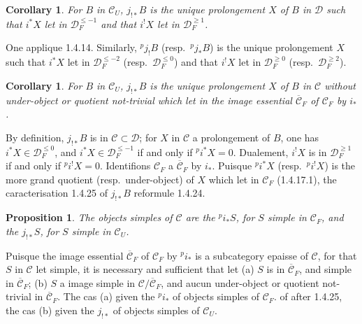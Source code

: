 \documentclass[12pt,a4paper]{article}
\theoremstyle{plain}
\newtheorem{proposition}[theorem]{Proposition}
\newtheorem{corollary}[theorem]{Corollary}
\theoremstyle{definition}
\begin{document}
\begin{corollary}\label{cor:1.4.24}
For $B$ in $\mathcal{C}_U$, $j_{!*} B$ is the unique prolongement $X$ of $B$ in $\mathcal{D}$ such that $i^* X$ let in $\mathcal{D}_F^{\leqslant -1}$ and that $i^! X$ let in $\mathcal{D}_F^{\geqslant 1}$.
\end{corollary}

One applique 1.4.14. Similarly, ${}^p j_! B$ (resp.\ ${}^p j_* B$) is the unique prolongement $X$ such that $i^* X$ let in $\mathcal{D}_F^{\leqslant -2}$ (resp.\ $\mathcal{D}_F^{\leqslant 0}$) and that $i^! X$ let in $\mathcal{D}_F^{\geqslant 0}$ (resp.\ $\mathcal{D}_F^{\geqslant 2}$).

\begin{corollary}\label{cor:1.4.25}
For $B$ in $\mathcal{C}_U$, $j_{!*} B$ is the unique prolongement $X$ of $B$ in $\mathcal{C}$ without under-object or quotient not-trivial which let in the image essential $\overline{\mathcal{C}}_F$ of $\mathcal{C}_F$ by $i_*$.
\end{corollary}

By definition, $j_{!*} B$ is in $\mathcal{C} \subset \mathcal{D}$; for $X$ in $\mathcal{C}$ a prolongement of $B$, one has $i^* X \in \mathcal{D}_F^{\leqslant 0}$, and $i^* X \in \mathcal{D}_F^{\leqslant -1}$ if and only if ${}^p i^* X = 0$. Dualement, $i^! X$ is in $\mathcal{D}_F^{\geqslant 1}$ if and only if ${}^p i^! X = 0$. Identifions $\mathcal{C}_F$ a $\overline{\mathcal{C}}_F$ by $i_*$. Puisque ${}^p i^* X$ (resp.\ ${}^p i^! X$) is the more grand quotient (resp.\ under-object) of $X$ which let in $\mathcal{C}_F$ (1.4.17.1), the caracterisation 1.4.25 of $j_{!*} B$ reformule 1.4.24.

\begin{proposition}\label{prop:1.4.26}
The objects simples of $\mathcal{C}$ are the ${}^p i_* S$, for $S$ simple in $\mathcal{C}_F$, and the $j_{!*} S$, for $S$ simple in $\mathcal{C}_U$.
\end{proposition}

Puisque the image essential $\overline{\mathcal{C}}_F$ of $\mathcal{C}_F$ by ${}^p i_*$ is a subcategory epaisse of $\mathcal{C}$, for that $S$ in $\mathcal{C}$ let simple, it is necessary and sufficient that let (a) $S$ is in $\overline{\mathcal{C}}_F$, and simple in $\overline{\mathcal{C}}_F$; (b) $S$ a image simple in $\mathcal{C}/\overline{\mathcal{C}}_F$, and aucun under-object or quotient not-trivial in $\overline{\mathcal{C}}_F$. The cas (a) given the ${}^p i_*$ of objects simples of $\mathcal{C}_F$. of after 1.4.25, the cas (b) given the $j_{!*}$ of objects simples of $\mathcal{C}_U$.
\end{document}
